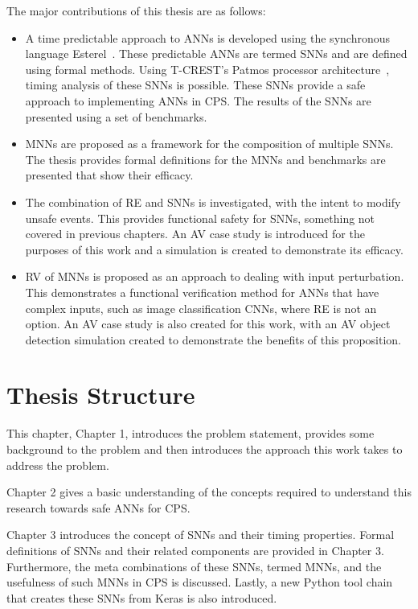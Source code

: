 The major contributions of this thesis are as follows:
\begin{itemize}
	\item A time predictable approach to \acp{ANN} is developed using the synchronous language Esterel~\cite{berry2000foundations}. These predictable \acp{ANN} are termed \acfp{SNN} and are defined using formal methods. Using T-CREST's Patmos processor architecture~\cite{patmos:ppes2011}, timing analysis of these \acp{SNN} is possible. These \acp{SNN} provide a safe approach to implementing \acp{ANN} in \ac{CPS}. The results of the \acp{SNN} are presented using a set of benchmarks. 
	\item \acfp{MNN} are proposed as a framework for the composition of multiple \acp{SNN}. The thesis provides formal definitions for the \acp{MNN} and benchmarks are presented that show their efficacy. 
	\item The combination of \acf{RE} and \acp{SNN} is investigated, with the intent to modify unsafe events. This provides functional safety for \acp{SNN}, something not covered in previous chapters. An \acf{AV} case study is introduced for the purposes of this work and a simulation is created to demonstrate its efficacy.
	\item \acf{RV} of \acp{MNN} is proposed as an approach to dealing with input perturbation. This demonstrates a functional verification method for \acp{ANN} that have complex inputs, such as image classification \acfp{CNN}, where \ac{RE} is not an option. An \ac{AV} case study is also created for this work, with an \ac{AV} object detection simulation created to demonstrate the benefits of this proposition. 
\end{itemize}

\section{Thesis Structure}
This chapter, Chapter 1, introduces the problem statement, provides some background to the problem and then introduces the approach this work takes to address the problem.

Chapter 2 gives a basic understanding of the concepts required to understand this research towards safe \acp{ANN} for \ac{CPS}.

Chapter 3 introduces the concept of \acfp{SNN} and their timing properties.
Formal definitions of \acp{SNN} and their related components are provided in Chapter 3.
Furthermore, the meta combinations of these \acp{SNN}, termed \acp{MNN}, and the usefulness of such \acp{MNN} in \ac{CPS} is discussed.
Lastly, a new Python tool chain that creates these \acp{SNN} from Keras is also introduced.

